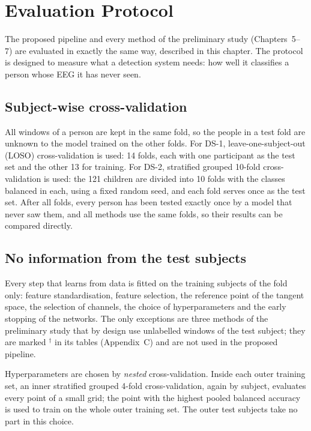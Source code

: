 \chapter{Evaluation Protocol}
\thispagestyle{empty}

The proposed pipeline and every method of the preliminary study (Chapters~5--7) are evaluated in
exactly the same way, described in this chapter. The
protocol is designed to measure what a detection system needs: how well it classifies a
person whose EEG it has never seen.

\section{Subject-wise cross-validation}
\label{sec:protocol}
All windows of a person are kept in the same fold, so the people in a test fold are unknown to
the model trained on the other folds. For DS-1, leave-one-subject-out (LOSO) cross-validation
is used: 14 folds, each with one participant as the test set and the other 13 for training.
For DS-2, stratified grouped 10-fold cross-validation is used: the 121 children are divided
into 10 folds with the classes balanced in each, using a fixed random seed, and each fold
serves once as the test set. After all folds, every person has been tested exactly once by a
model that never saw them, and all methods use the same folds, so their results can be
compared directly.

\section{No information from the test subjects}
Every step that learns from data is fitted on the training subjects of the fold only: feature
standardisation, feature selection, the reference point of the tangent space, the selection of
channels, the choice of hyperparameters and the early stopping of the networks. The only
exceptions are three methods of the preliminary study that by design use unlabelled windows of
the test subject; they are marked $^\dagger$ in its tables (Appendix~C) and are not used in the
proposed pipeline.

Hyperparameters are chosen by \emph{nested} cross-validation. Inside each outer training set,
an inner stratified grouped 4-fold cross-validation, again by subject, evaluates every point of
a small grid; the point with the highest pooled balanced accuracy is used to train on the whole
outer training set. The outer test subjects take no part in this choice.

